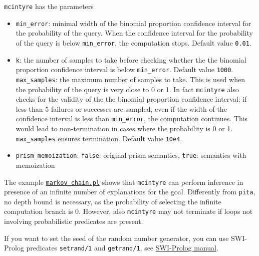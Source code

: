 \verb|mcintyre| has the parameters
\begin{itemize}
\item \verb|min_error|: minimal width of the binomial proportion confidence interval for the probability of the query. When the confidence interval for the probability of the query is below \verb|min_error|, 
the computation stops.
 Default value \verb|0.01|.
\item 
\verb|k|:  the number of samples to take before checking whether the the binomial proportion confidence interval is below \verb|min_error|.
Default value \verb|1000|.
\verb|max_samples|: the maximum number of samples to take. This is used when the probability of the
query is very close to 0 or 1. In fact \verb|mcintyre| also checks for the validity of the
the binomial proportion confidence interval: if less than 5 failures or successes are sampled,
even if the width of the confidence interval is less than \verb|min_error|, the computation continues.
This would lead to non-termination in cases where the probability is 0 or 1. 
\verb|max_samples| ensures termination.
 Default value \verb|10e4|.
\item \verb|prism_memoization|: \verb|false|: original prism semantics, \verb|true|: semantics with memoization
\end{itemize}
The example \href{http://cplint.eu/e/markov_chain.pl}{\texttt{markov\_chain.pl}}
shows that \verb|mcintyre| can perform inference in presence of an infinite number of explanations for 
the goal. Differently from \verb|pita|, no depth bound is necessary, as the probability of selecting
the infinite computation branch is 0. However, also \verb|mcintyre| may not terminate if loops not
involving probabilistic predicates are present.

If you want to set the seed of the random number generator, you can use SWI-Prolog predicates \verb|setrand/1| and \verb|getrand/1|, see
\href{http://www.swi-prolog.org/pldoc/doc_for?object=setrand/1}{SWI-Prolog manual}.